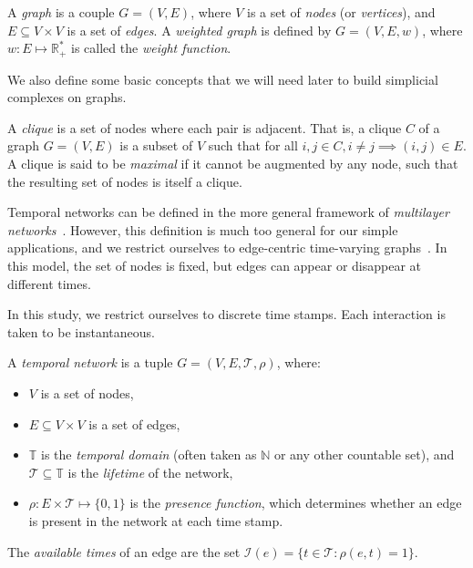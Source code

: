 \documentclass[a4paper,11pt,openany,extrafontsizes]{memoir}
\begin{document}
\begin{defn}[Graph]
  A \emph{graph} is a couple $G = (V, E)$, where $V$ is a set of
  \emph{nodes} (or \emph{vertices}), and $E \subseteq V\times V$ is a
  set of \emph{edges}. A \emph{weighted graph} is defined by
  $G = (V, E, w)$, where $w : E\mapsto \mathbb{R}_+^*$ is called the
  \emph{weight function}.
\end{defn}

We also define some basic concepts that we will need later to build
simplicial complexes on graphs.

\begin{defn}[Clique]
  A \emph{clique} is a set of nodes where each pair is adjacent. That
  is, a clique $C$ of a graph $G = (V,E)$ is a subset of $V$ such that
  for all $i,j\in C, i \neq j \implies (i,j)\in E$. A clique is said
  to be \emph{maximal} if it cannot be augmented by any node, such
  that the resulting set of nodes is itself a clique.
\end{defn}

Temporal networks can be defined in the more general framework of
\emph{multilayer networks}~\cite{kivela_multilayer_2014}. However,
this definition is much too general for our simple applications, and
we restrict ourselves to edge-centric time-varying
graphs~\cite{casteigts_time-varying_2012}. In this model, the set of
nodes is fixed, but edges can appear or disappear at different times.

In this study, we restrict ourselves to discrete time stamps. Each
interaction is taken to be instantaneous.

\begin{defn}
  A \emph{temporal network} is a tuple
  $G = (V, E, \mathcal{T}, \rho)$, where:
  \begin{itemize}
  \item $V$ is a set of nodes,
  \item $E\subseteq V\times V$ is a set of edges,
  \item $\mathbb{T}$ is the \emph{temporal domain} (often taken as
    $\mathbb{N}$ or any other countable set), and
    $\mathcal{T}\subseteq\mathbb{T}$ is the \emph{lifetime} of the
    network,
  \item $\rho: E\times\mathcal{T}\mapsto\{0,1\}$ is the \emph{presence
      function}, which determines whether an edge is present in the
    network at each time stamp.
  \end{itemize}
  The \emph{available times} of an edge are the set
  $\mathcal{I}(e) = \{t\in\mathcal{T}: \rho(e,t)=1\}$.
\end{defn}
\end{document}
